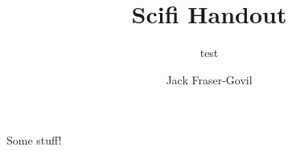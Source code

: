 \documentclass[theme=scifi]{rpghandout}
\title{Scifi Handout}
\author{Jack Fraser-Govil}
\subtitle{test}
\begin{document}
    \maketitle

    Some stuff!
\end{document}
